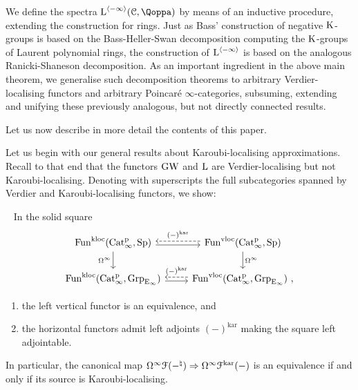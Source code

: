 We define the spectra $\L^{\cotower{-\infty}}(\C,\QF)$ by means of an inductive procedure, extending the construction for rings. Just as Bass' construction of negative $\operatorname K$-groups is based on the Bass-Heller-Swan decomposition computing the $\operatorname K$-groups of Laurent polynomial rings, the construction of $\operatorname L^{\langle -\infty \rangle}$ is based on the analogous Ranicki-Shaneson decomposition. As an important ingredient in the above main theorem, we generalise such decomposition theorems to arbitrary Verdier-localising functors and arbitrary Poincar\'e $\infty$-categories, subsuming, extending and unifying these previously analogous, but not directly connected results.

Let us now describe in more detail the contents of this paper. 





Let us begin with our general results about Karoubi-localising approximations. Recall to that end that the functors $\operatorname{GW}$ and $\operatorname L$ are Verdier-localising but not Karoubi-localising.
Denoting with superscripts the full subcategories spanned by Verdier and Karoubi-localising functors, we show: 
\begin{theoremintrofour}\
\label{theorem:intro-B}%
In the solid square
\[
\begin{tikzcd}
\Fun^{\kloc}(\Catp,\Sp)\ar[r,shift right=2pt]\ar[d,"\Omega^\infty"'] & \Fun^{\vloc}(\Catp,\Sp)\ar[d,"\Omega^\infty"] \ar[l,dashed, shift right=2pt,"(-)^\mathrm{kar}"'] \\
\Fun^{\kloc}(\Catp,\Grp_{\Einf})\ar[r,shift right=2pt] & \Fun^{\vloc}(\Catp,\Grp_{\Einf}) \ar[l,dashed,shift right=2pt,"(-)^\mathrm{kar}"'] \ ,
\end{tikzcd}
\]
\begin{enumerate}
\item
\label{item:delooping}%
the left vertical functor is an equivalence, and
\item
\label{item:adjoint}%
the horizontal functors admit left adjoints $(-)^\mathrm{kar}$ making the square left adjointable.
\end{enumerate}
In particular, the canonical map $\Omega^\infty \mathcal{F}(-^\natural) \Rightarrow \Omega^\infty \mathcal{F}^{\mathrm{kar}}(-)$ is an equivalence if and only if its source is Karoubi-localising.

\end{theoremintrofour}

